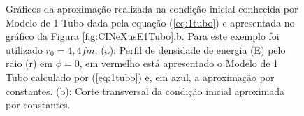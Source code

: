 \documentclass[a4paper,12pt]{article}
\begin{document}
\begin{figure}[H]
  \centering

  \caption{Gráficos da aproximação realizada na condição inicial conhecida por Modelo de 1 Tubo dada pela equação (\ref{eq:1tubo}) e apresentada no gráfico da Figura \ref{fig:CINeXusE1Tubo}.b. Para este exemplo foi utilizado $r_0 = 4,4 fm$. (a): Perfil de densidade de energia (E) pelo raio (r) em $\phi = 0$, em vermelho está apresentado o Modelo de 1 Tubo calculado por (\ref{eq:1tubo}) e, em azul, a aproximação por constantes. (b): Corte transversal da condição inicial aproximada por constantes.}
  \label{fig:AproxModelo1Tubo}
\end{figure}
\end{document}
